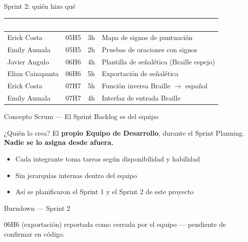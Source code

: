\documentclass[11pt,aspectratio=169]{beamer}
\begin{document}
\begin{frame}{Sprint 2: quién hizo qué}
  \scriptsize
  \renewcommand{\arraystretch}{1.3}
  \begin{tabular}{|l|c|c|p{5.8cm}|}
    \hline
    \rowcolor{epnblue}
    \textcolor{white}{Responsable} & \textcolor{white}{HU} & \textcolor{white}{h} & \textcolor{white}{Tarea} \\
    \hline
    Erick Costa & 05H5 & 3h & Mapa de signos de puntuación \\
    \rowcolor{epnrow} Emily Aumala & 05H5 & 2h & Pruebas de oraciones con signos \\
    Javier Angulo & 06H6 & 4h & Plantilla de señalética (Braille espejo) \\
    \rowcolor{epnrow} Elian Caizapanta & 06H6 & 5h & Exportación de señalética \\
    Erick Costa & 07H7 & 5h & Función inversa Braille $\rightarrow$ español \\
    \rowcolor{epnrow} Emily Aumala & 07H7 & 4h & Interfaz de entrada Braille \\
    \hline
  \end{tabular}
\end{frame}

\begin{frame}{Concepto Scrum --- El Sprint Backlog es del equipo}
  \begin{block}{¿Quién lo crea?}
    El \textbf{propio Equipo de Desarrollo}, durante el Sprint Planning. \textbf{Nadie se lo asigna
    desde afuera.}
  \end{block}
  \begin{itemize}
    \item Cada integrante toma tareas según disponibilidad y habilidad
    \item Sin jerarquías internas dentro del equipo
    \item Así se planificaron el Sprint 1 y el Sprint 2 de este proyecto
  \end{itemize}
\end{frame}

\begin{frame}{Burndown --- Sprint 2}
  \begin{center}
  \end{center}
  \centering\small 06H6 (exportación) reportada como cerrada por el equipo --- pendiente de confirmar en código.
\end{frame}
\end{document}
